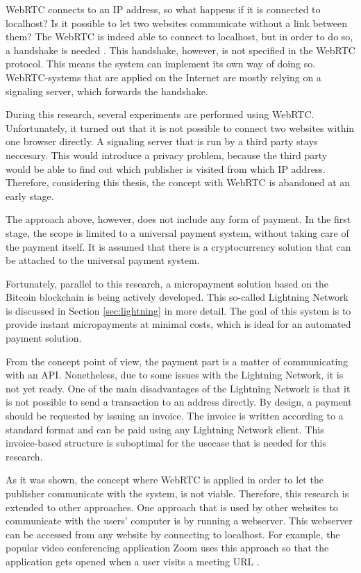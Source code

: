WebRTC connects to an IP address, so what happens if it is connected to localhost? Is it possible to let two websites communicate without a link between them? The WebRTC is indeed able to connect to localhost, but in order to do so, a handshake is needed \cite{dutton2013webrtc}. This handshake, however, is not specified in the WebRTC protocol. This means the system can implement its own way of doing so. WebRTC-systems that are applied on the Internet are mostly relying on a signaling server, which forwards the handshake. 

During this research, several experiments are performed using WebRTC. Unfortunately, it turned out that it is not possible to connect two websites within one browser directly. A signaling server that is run by a third party stays neccesary. This would introduce a privacy problem, because the third party would be able to find out which publisher is visited from which IP address. Therefore, considering this thesis, the concept with WebRTC is abandoned at an early stage.

The approach above, however, does not include any form of payment. In the first stage, the scope is limited to a universal payment system, without taking care of the payment itself. It is assumed that there is a cryptocurrency solution that can be attached to the universal payment system.

Fortunately, parallel to this research, a micropayment solution based on the Bitcoin block\-chain is being actively developed. This so-called Lightning Network is discussed in Section \ref{sec:lightning} in more detail. The goal of this system is to provide instant micropayments at minimal costs, which is ideal for an automated payment solution.

From the concept point of view, the payment part is a matter of communicating with an API. Nonetheless, due to some issues with the Lightning Network, it is not yet ready. One of the main disadvantages of the Lightning Network is that it is not possible to send a transaction to an address directly. By design, a payment should be requested by issuing an invoice. The invoice is written according to a standard format and can be paid using any Lightning Network client. This invoice-based structure is suboptimal for the usecase that is needed for this research.

As it was shown, the concept where WebRTC is applied in order to let the publisher communicate with the system, is not viable. Therefore, this research is extended to other approaches. One approach that is used by other websites to communicate with the users' computer is by running a webserver. This webserver can be accessed from any website by connecting to localhost. For example, the popular video conferencing application Zoom uses this approach so that the application gets opened when a user visits a meeting URL \cite{zoomwebserver}.

